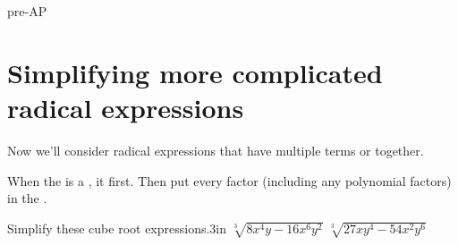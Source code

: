 \begin{taggedblock}{pre-AP}
\section*{Simplifying more complicated radical expressions}
    
Now we'll consider radical expressions that have multiple terms  or  together.

\begin{myCenteredBox}[width=6.5in]
    \large
    When the  is a ,
     it first.
    Then put every factor (including any polynomial factors) in the .
\end{myCenteredBox}


\begin{myProblems2}{Simplify these cube root expressions.}{3in}
    {
        $\sqrt[3]{ 8 x^4 y  -  16 x^6 y^2 }$ 
    }
    {
        $\sqrt[3]{ 27 x y^4  -  54 x^2 y^6 }$ 
    }
\end{myProblems2}
\end{taggedblock}
